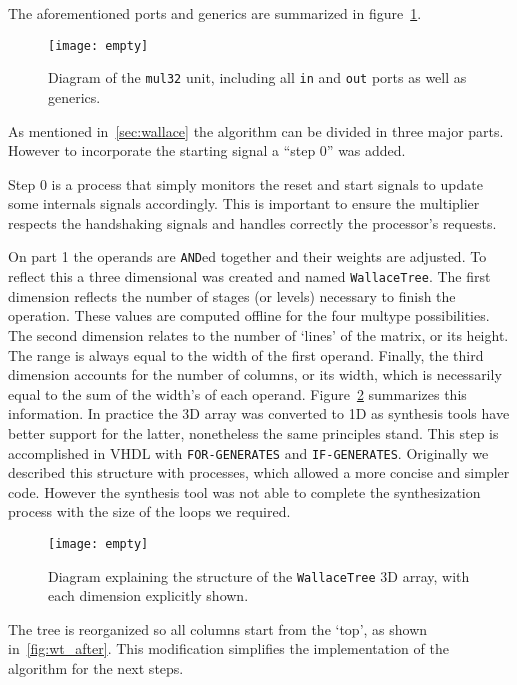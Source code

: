 The aforementioned ports and generics are summarized in figure~\ref{fig:mul32_dia}.

\begin{figure}[H]
\centering
\texttt{[image: empty]}
\caption{Diagram of the \texttt{mul32} unit, including all \texttt{in} and \texttt{out} ports as well as generics.}
\label{fig:mul32_dia}
\end{figure}

As mentioned in~\ref{sec:wallace} the algorithm can be divided in three major parts. However to incorporate the starting signal a ``step 0'' was added.

Step 0 is a process that simply monitors the reset and start signals to update some internals signals accordingly. This is important to ensure the multiplier respects the handshaking signals and handles correctly the processor's requests.

On part 1 the operands are \texttt{AND}ed together and their weights are adjusted. To reflect this a three dimensional \STDV was created and named \texttt{WallaceTree}. The first dimension reflects the number of stages (or levels) necessary to finish the operation. These values are computed offline for the four multype possibilities. The second dimension relates to the number of `lines' of the matrix, or its height. The range is always equal to the width of the first operand. Finally, the third dimension accounts for the number of columns, or its width, which is necessarily equal to the sum of the width's of each operand. Figure~\ref{fig:wallace_tree_array} summarizes this information. In practice the 3D array was converted to 1D as synthesis tools have better support for the latter, nonetheless the same principles stand. This step is accomplished in VHDL with \texttt{FOR-GENERATES} and \texttt{IF-GENERATES}. Originally we described this structure with processes, which allowed a more concise and simpler code. However the synthesis tool was not able to complete the synthesization process with the size of the loops we required.

\begin{figure}[H]
\centering
\texttt{[image: empty]}
\caption{Diagram explaining the structure of the \texttt{WallaceTree} 3D array, with each dimension explicitly shown.}
\label{fig:wallace_tree_array}
\end{figure}

The tree is reorganized so all columns start from the `top', as shown in~\ref{fig:wt_after}. This modification simplifies the implementation of the algorithm for the next steps.

